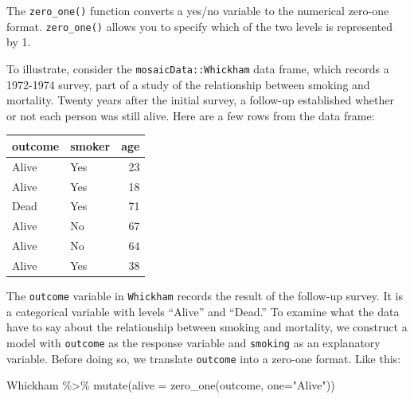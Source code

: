 \documentclass[
  letterpaper,
  DIV=11,
  numbers=noendperiod,
  oneside]{scrreprt}
\newenvironment{Shaded}{\begin{snugshade}}{\end{snugshade}}
\newcommand{\AttributeTok}[1]{\textcolor[rgb]{0.40,0.45,0.13}{#1}}
\newcommand{\FunctionTok}[1]{\textcolor[rgb]{0.28,0.35,0.67}{#1}}
\newcommand{\NormalTok}[1]{\textcolor[rgb]{0.00,0.23,0.31}{#1}}
\newcommand{\SpecialCharTok}[1]{\textcolor[rgb]{0.37,0.37,0.37}{#1}}
\newcommand{\StringTok}[1]{\textcolor[rgb]{0.13,0.47,0.30}{#1}}
\begin{document}
\begin{tcolorbox}[enhanced jigsaw, colbacktitle=quarto-callout-note-color!10!white, breakable, opacitybacktitle=0.6, colback=white, left=2mm, arc=.35mm, colframe=quarto-callout-note-color-frame, coltitle=black, toprule=.15mm, opacityback=0, leftrule=.75mm, bottomtitle=1mm, toptitle=1mm, titlerule=0mm, title=\textcolor{quarto-callout-note-color}{\faInfo}\hspace{0.5em}{R technique: \texttt{zero\_one()}.}, rightrule=.15mm, bottomrule=.15mm]

The \texttt{zero\_one()} function converts a yes/no variable to the
numerical zero-one format. \texttt{zero\_one()} allows you to specify
which of the two levels is represented by 1.

To illustrate, consider the \texttt{mosaicData::Whickham} data frame,
which records a 1972-1974 survey, part of a study of the relationship
between smoking and mortality. Twenty years after the initial survey, a
follow-up established whether or not each person was still alive. Here
are a few rows from the data frame:

\ttfamily 
\begin{tabular}{llr}
\toprule
outcome & smoker & age\\
\midrule
Alive & Yes & 23\\
Alive & Yes & 18\\
Dead & Yes & 71\\
Alive & No & 67\\
Alive & No & 64\\
\addlinespace
Alive & Yes & 38\\
\bottomrule
\end{tabular} \normalfont
\bigskip

The \texttt{outcome} variable in \texttt{Whickham} records the result of
the follow-up survey. It is a categorical variable with levels ``Alive''
and ``Dead.'' To examine what the data have to say about the
relationship between smoking and mortality, we construct a model with
\texttt{outcome} as the response variable and \texttt{smoking} as an
explanatory variable. Before doing so, we translate \texttt{outcome}
into a zero-one format. Like this:

\begin{Shaded}
\begin{Highlighting}[]
\NormalTok{Whickham }\SpecialCharTok{\%\textgreater{}\%} 
  \FunctionTok{mutate}\NormalTok{(}\AttributeTok{alive =} \FunctionTok{zero\_one}\NormalTok{(outcome, }\AttributeTok{one=}\StringTok{"Alive"}\NormalTok{))}
\end{Highlighting}
\end{Shaded}


\end{tcolorbox}
\end{document}

